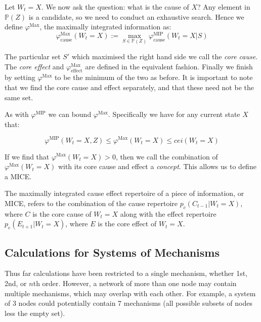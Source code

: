 Let $W_t = X$. We now ask the question: what is the cause of $X$? Any element in $\mathbb{P}(Z)$ is a candidate, so we need to conduct an exhaustive search. Hence we define $\varphi^{\text{Max}}$, the maximally integrated information as: 
\begin{equation}
\label{def:core_cause}
\varphi^{\text{Max}}_{\text{cause}}(W_t = X):=\max \limits_{S \in \mathbb{P}(Z)}\varphi^{\text{MIP}}_{\text{cause}}(W_t = X|S)
\end{equation}

The particular set $S'$ which maximised the right hand side we call the \textit{core cause}. The \textit{core effect} and $\varphi^{\text{Max}}_{\text{effect}}$ are defined in the equivalent fashion. Finally we finish  by setting $\varphi^{\text{Max}}$ to be the minimum of the two as before. It is important to note that we find the core cause and effect separately, and that these need not be the same set.

As with $\varphi^{\text{MIP}}$ we can bound $\varphi^{\text{Max}}$. Specifically we have for any current state $X$ that:

\begin{equation}
\label{eq:bound_phimax}
\varphi^{\text{MIP}}(W_t = X, Z) \leq \varphi^{\text{Max}}(W_t = X)\leq cei(W_t = X)
\end{equation}

If we find that $\varphi^{\text{Max}}(W_t = X)>0$, then we call the combination of $\varphi^{\text{Max}}(W_t = X)$ with its core cause and effect a \textit{concept}. This allows us to define a MICE.

\begin{definition}
	{The maximally integrated cause effect repertoire of a piece of information, or MICE, refers to the combination of the cause repertoire $p_c(C_{t-1}|W_t = X)$, where $C$ is the core cause of $W_t=X$ along with the effect repertoire $p_e(E_{t+1}|W_t = X)$, where $E$ is the core effect of $W_t = X$.}
\end{definition}

\subsection{Calculations for Systems of Mechanisms}
Thus far calculations have been restricted to a single mechanism, whether 1st, 2nd, or $n$th order. However, a network of more than one node may contain multiple mechanisms, which may overlap with each other. For example, a system of 3 nodes could potentially contain 7 mechanisms (all possible subsets of nodes less the empty set).


